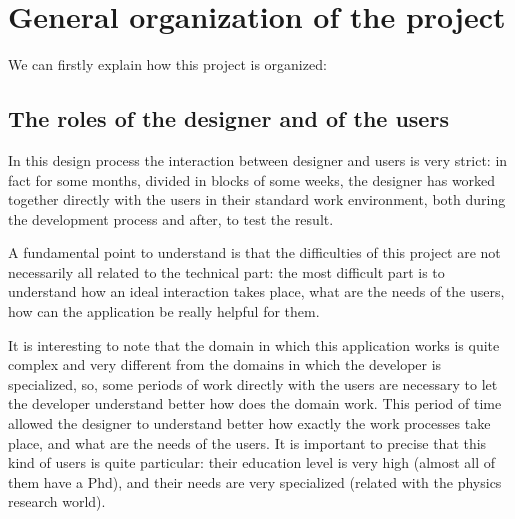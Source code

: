 
\chapter{General organization of the project} %

\label{Chapter2} %


We can firstly explain how this project is organized:

\section{The roles of the designer and of the users}
In this design process the interaction between designer and users is very strict: in fact for some months, divided in blocks of some weeks, the designer has worked together directly with the users in their standard work environment, both during the development process and after, to test the result. 

A fundamental point to understand is that the difficulties of this project are not necessarily all related to the technical part: the most difficult part is to understand how an ideal interaction takes place, what are the needs of the users, how can the application be really helpful for them.
 
It is interesting to note that the domain in which this application works is quite complex and very different from the domains in which the developer is specialized, so, some periods of work directly with the users are necessary to let the developer understand better how does the domain work.
This period of time allowed the designer to understand better how exactly the work processes take place, and what are the needs of the users. 
It is important to precise that this kind of users is quite particular: their education level is very high (almost all of them have a Phd), and their needs are very specialized (related with the physics research world).

